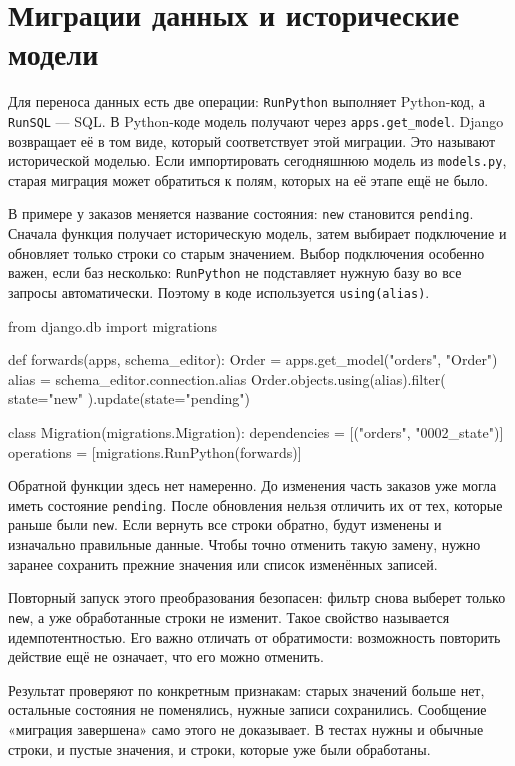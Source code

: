 \documentclass[11pt,a4paper]{article}
\newcommand{\parthead}[1]{\Needspace{10\baselineskip}\section{#1}}
\begin{document}
\parthead{Миграции данных и исторические модели}

Для переноса данных есть две операции: \texttt{RunPython} выполняет Python-код, а \texttt{RunSQL} --- SQL. В Python-коде модель получают через \texttt{apps.get\_model}. Django возвращает её в том виде, который соответствует этой миграции. Это называют исторической моделью. Если импортировать сегодняшнюю модель из \texttt{models.py}, старая миграция может обратиться к полям, которых на её этапе ещё не было.

В примере у заказов меняется название состояния: \texttt{new} становится \texttt{pending}. Сначала функция получает историческую модель, затем выбирает подключение и обновляет только строки со старым значением. Выбор подключения особенно важен, если баз несколько: \texttt{RunPython} не подставляет нужную базу во все запросы автоматически. Поэтому в коде используется \texttt{using(alias)}.
\begin{code}
from django.db import migrations

def forwards(apps, schema_editor):
    Order = apps.get_model("orders", "Order")
    alias = schema_editor.connection.alias
    Order.objects.using(alias).filter(
        state="new"
    ).update(state="pending")

class Migration(migrations.Migration):
    dependencies = [("orders", "0002_state")]
    operations = [migrations.RunPython(forwards)]
\end{code}

Обратной функции здесь нет намеренно. До изменения часть заказов уже могла иметь состояние \texttt{pending}. После обновления нельзя отличить их от тех, которые раньше были \texttt{new}. Если вернуть все строки обратно, будут изменены и изначально правильные данные. Чтобы точно отменить такую замену, нужно заранее сохранить прежние значения или список изменённых записей.

Повторный запуск этого преобразования безопасен: фильтр снова выберет только \texttt{new}, а уже обработанные строки не изменит. Такое свойство называется идемпотентностью. Его важно отличать от обратимости: возможность повторить действие ещё не означает, что его можно отменить.

Результат проверяют по конкретным признакам: старых значений больше нет, остальные состояния не поменялись, нужные записи сохранились. Сообщение «миграция завершена» само этого не доказывает. В тестах нужны и обычные строки, и пустые значения, и строки, которые уже были обработаны.
\end{document}
